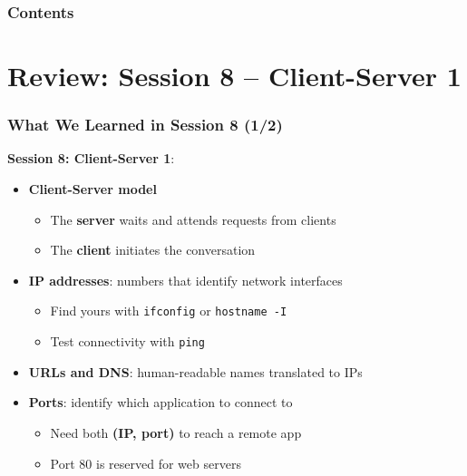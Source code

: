 \documentclass[xcolor=table]{beamer}
\title[\asignatura]{\asignatura}
\subtitle{\grado}
\author{URJC}
\institute{GSyC}
\date{Course \curso}
\begin{document}
\frame{
\maketitle
}

\begin{frame}
\frametitle{Contents}
\tableofcontents
\end{frame}


\section{Review: Session 8 -- Client-Server 1}

\begin{frame}
\frametitle{What We Learned in Session 8 (1/2)}

\textbf{Session 8: Client-Server 1}:

\begin{itemize}
\item \textbf{Client-Server model}
  \begin{itemize}
  \item The \textbf{server} waits and attends requests from clients
  \item The \textbf{client} initiates the conversation
  \end{itemize}
\vspace{0.15cm}
\item \textbf{IP addresses}: numbers that identify network interfaces
  \begin{itemize}
  \item Find yours with \texttt{ifconfig} or \texttt{hostname -I}
  \item Test connectivity with \texttt{ping}
  \end{itemize}
\vspace{0.15cm}
\item \textbf{URLs and DNS}: human-readable names translated to IPs
\vspace{0.15cm}
\item \textbf{Ports}: identify which application to connect to
  \begin{itemize}
  \item Need both \textbf{(IP, port)} to reach a remote app
  \item Port 80 is reserved for web servers
  \end{itemize}
\end{itemize}

\end{frame}
\end{document}
